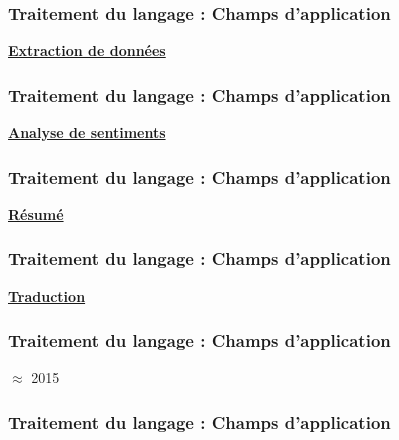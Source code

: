 \documentclass{formation}
\begin{document}
\begin{frame}
  \frametitle{Traitement du langage : Champs d'application}
  \underline{\textbf{Extraction de données}}
\end{frame}

\begin{frame}
  \frametitle{Traitement du langage : Champs d'application}
  \underline{\textbf{Analyse de sentiments}}
\end{frame}

\begin{frame}
  \frametitle{Traitement du langage : Champs d'application}
  \underline{\textbf{Résumé}}
\end{frame}

\begin{frame}
  \frametitle{Traitement du langage : Champs d'application}
  \underline{\textbf{Traduction}}
  \begin{center}
  \end{center}
\end{frame}

\begin{frame}
  \frametitle{Traitement du langage : Champs d'application}
  \begin{center}
    $\approx$ 2015
  \end{center}
\end{frame}

\begin{frame}
  \frametitle{Traitement du langage : Champs d'application}
\end{frame}
\end{document}
